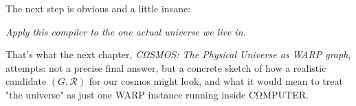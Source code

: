 The next step is obvious and a little insane:

\begin{center}
\emph{Apply this compiler to the one actual universe we live in.}
\end{center}

\noindent
That’s what the next chapter, \emph{CΩSMOS: The Physical Universe as WARP graph},
attempts: not a precise final answer, but a concrete sketch of how a realistic
candidate $(G,\mathcal{R})$ for our cosmos might look, and what it would mean
to treat "the universe" as just one WARP instance running inside CΩMPUTER.
